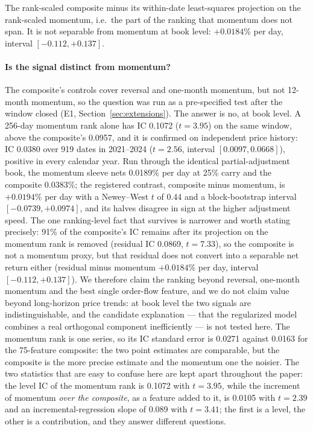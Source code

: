 \begin{table}[htbp]
\begin{threeparttable}
\begin{tablenotes}
\item[b] The rank-scaled composite minus its within-date least-squares projection on the rank-scaled momentum, i.e.\ the part of the ranking that momentum does not span. It is not separable from momentum at book level: $+0.0184$\% per day, interval $[-0.112,+0.137]$.
\end{tablenotes}
\end{threeparttable}
\end{table}

\paragraph{Is the signal distinct from momentum?} The composite's controls cover reversal and one-month momentum, but not 12-month momentum, so the question was run as a pre-specified test after the window closed (E1, Section~\ref{sec:extensions}). The answer is no, at book level. A 256-day momentum rank alone has IC 0.1072 ($t=3.95$) on the same window, above the composite's 0.0957, and it is confirmed on independent price history: IC 0.0380 over 919 dates in 2021--2024 ($t=2.56$, interval $[0.0097,0.0668]$), positive in every calendar year. Run through the identical partial-adjustment book, the momentum sleeve nets 0.0189\% per day at 25\% carry and the composite 0.0383\%; the registered contrast, composite minus momentum, is $+0.0194$\% per day with a Newey--West $t$ of 0.44 and a block-bootstrap interval $[-0.0739,+0.0974]$, and its halves disagree in sign at the higher adjustment speed. The one ranking-level fact that survives is narrower and worth stating precisely: 91\% of the composite's IC remains after its projection on the momentum rank is removed (residual IC 0.0869, $t=7.33$), so the composite is not a momentum proxy, but that residual does not convert into a separable net return either (residual minus momentum $+0.0184$\% per day, interval $[-0.112,+0.137]$). We therefore claim the ranking beyond reversal, one-month momentum and the best single order-flow feature, and we do not claim value beyond long-horizon price trends: at book level the two signals are indistinguishable, and the candidate explanation --- that the regularized model combines a real orthogonal component inefficiently --- is not tested here. The momentum rank is one series, so its IC standard error is 0.0271 against 0.0163 for the 75-feature composite: the two point estimates are comparable, but the composite is the more precise estimate and the momentum one the noisier. The two statistics that are easy to confuse here are kept apart throughout the paper: the level IC of the momentum rank is 0.1072 with $t=3.95$, while the increment of momentum \emph{over the composite}, as a feature added to it, is 0.0105 with $t=2.39$ and an incremental-regression slope of 0.089 with $t=3.41$; the first is a level, the other is a contribution, and they answer different questions.

